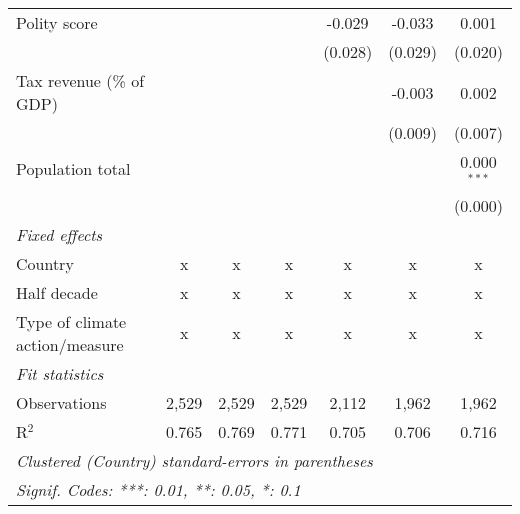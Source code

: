 \begin{tabular}{lcccccc}
   Polity score                                                                  &         &              &              & -0.029       & -0.033       & 0.001\\   
                                                                                 &         &              &              & (0.028)      & (0.029)      & (0.020)\\   
   Tax revenue (\% of GDP)                                                       &         &              &              &              & -0.003       & 0.002\\   
                                                                                 &         &              &              &              & (0.009)      & (0.007)\\   
   Population total                                                              &         &              &              &              &              & 0.000$^{***}$\\   
                                                                                 &         &              &              &              &              & (0.000)\\   
   \emph{Fixed effects}\\
   Country                                                                       & x       & x            & x            & x            & x            & x\\  
   Half decade                                                                   & x       & x            & x            & x            & x            & x\\  
   Type of climate action/measure                                                & x       & x            & x            & x            & x            & x\\  
   \midrule \emph{Fit statistics}\\
   Observations                                                                  & 2,529   & 2,529        & 2,529        & 2,112        & 1,962        & 1,962\\  
   R$^2$                                                                         & 0.765   & 0.769        & 0.771        & 0.705        & 0.706        & 0.716\\  
   \midrule
   \multicolumn{7}{l}{\emph{Clustered (Country) standard-errors in parentheses}}\\
   \multicolumn{7}{l}{\emph{Signif. Codes: ***: 0.01, **: 0.05, *: 0.1}}\\
\end{tabular}
\par\endgroup


